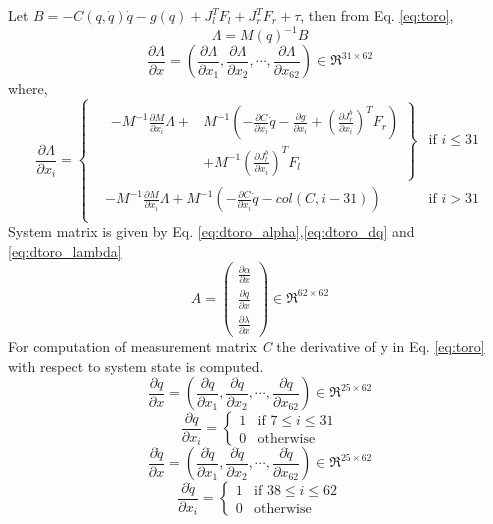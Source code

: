 \documentclass[12pt]{article}
\def\dfdx#1#2{\frac{\partial {#1}}{\partial {#2}}}
\begin{document}
Let $B = -C(q,\dot{q})\dot{q} - g(q) + J_{l}^{T}F_{l} + J_{r}^{T}F_{r} + \tau$, then from Eq. \ref{eq:toro},
$$\Lambda = M(q)^{-1}B$$
 \begin{equation}
 \label{eq:dtoro_lambda}
\dfdx{\Lambda}{x} = \left(\dfdx{\Lambda}{x_{1}}, \dfdx{\Lambda}{x_{2}}, \cdots , \dfdx{\Lambda}{x_{62}}\right) \in \Re^{31 \times 62}
\end{equation}
where,
\[
\dfdx{\Lambda}{x_{i}} = 
\left\{ 
\!\begin{aligned}
	& \left. \!\begin{aligned}
	-M^{-1}\dfdx{M}{x_{i}}\Lambda + &M^{-1}\left(-\dfdx{C}{x_{i}}\dot{q} -\dfdx{g}{x_{i}}        + \left(\dfdx{J_{r}^{b}}{x_{i}}\right)^{T}F_{r}\right) \\
	& + M^{-1}\left(\dfdx{J_{l}^{b}}{x_{i}}\right)^{T}F_{l}
	\end{aligned} \right\}& \text{if } i \leq 31 \\
&-M^{-1}\dfdx{M}{x_{i}}\Lambda + M^{-1}\left(-\dfdx{C}{x_{i}}\dot{q}- col(C,i-31)\right) & \text{if } i > 31  \\
\end{aligned}
\right.
\]
System matrix is given by Eq. \ref{eq:dtoro_alpha},\ref{eq:dtoro_dq} and \ref{eq:dtoro_lambda}
\begin{equation}
\label{eq:sys_A}
A = \left(
\begin{aligned}
\dfdx{\alpha}{x} \\
\dfdx{\dot{q}}{x} \\
\dfdx{\lambda}{x}
\end{aligned} \right)
\in \Re^{62 \times 62}
\end{equation}
For computation of measurement matrix \emph{C} the derivative of y in Eq. \ref{eq:toro} with respect to system state is computed.
\begin{equation}
\label{eq:dmsr_q}
\dfdx{q}{x} = \left(\dfdx{q}{x_{1}}, \dfdx{q}{x_{2}}, \cdots , \dfdx{q}{x_{62}}\right) \in \Re^{25 \times 62}
\end{equation}
 \[
 \dfdx{q}{x_{i}} =
 \begin{cases}
 1 & \text{if } 7 \leq i \leq 31 \\
 0 & \text{otherwise}
 \end{cases}
 \]
 \begin{equation}
 \label{eq:dmsr_dq}
\dfdx{\dot{q}}{x} = \left(\dfdx{\dot{q}}{x_{1}}, \dfdx{\dot{q}}{x_{2}}, \cdots , \dfdx{\dot{q}}{x_{62}}\right) \in \Re^{25 \times 62}
\end{equation}
  \[
 \dfdx{\dot{q}}{x_{i}} =
 \begin{cases}
 1 & \text{if } 38 \leq i \leq 62 \\
 0 & \text{otherwise}
 \end{cases}
 \]
\end{document}
